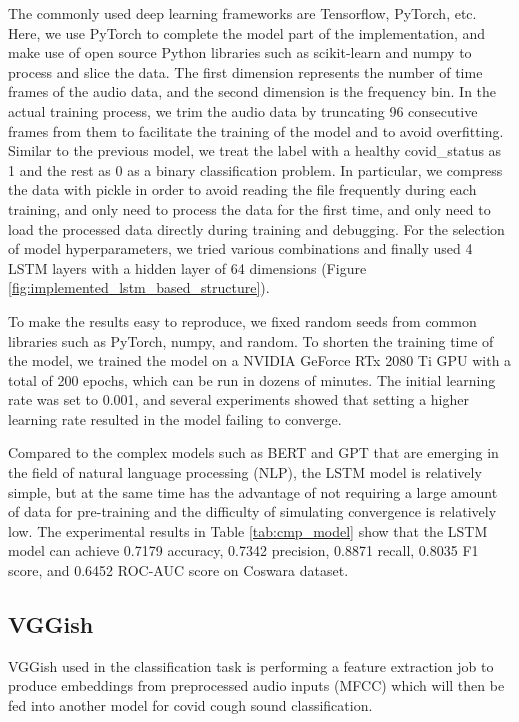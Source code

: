 \documentclass[11pt]{article}
\begin{document}
The commonly used deep learning frameworks are Tensorflow, PyTorch, etc. Here, we use PyTorch to complete the model part of the implementation, and make use of open source Python libraries such as scikit-learn and numpy to process and slice the data. The first dimension represents the number of time frames of the audio data, and the second dimension is the frequency bin. In the actual training process, we trim the audio data by truncating 96 consecutive frames from them to facilitate the training of the model and to avoid overfitting. Similar to the previous model, we treat the label with a healthy covid\_status as 1 and the rest as 0 as a binary classification problem. In particular, we compress the data with pickle in order to avoid reading the file frequently during each training, and only need to process the data for the first time, and only need to load the processed data directly during training and debugging. For the selection of model hyperparameters, we tried various combinations and finally used 4 LSTM layers with a hidden layer of 64 dimensions (Figure \ref{fig:implemented_lstm_based_structure}).

To make the results easy to reproduce, we fixed random seeds from common libraries such as PyTorch, numpy, and random. To shorten the training time of the model, we trained the model on a NVIDIA GeForce RTx 2080 Ti GPU with a total of 200 epochs, which can be run in dozens of minutes. The initial learning rate was set to 0.001, and several experiments showed that setting a higher learning rate resulted in the model failing to converge.

Compared to the complex models such as BERT \cite{devlin2018bert} and GPT \cite{floridi2020gpt} that are emerging in the field of natural language processing (NLP), the LSTM model is relatively simple, but at the same time has the advantage of not requiring a large amount of data for pre-training and the difficulty of simulating convergence is relatively low. The experimental results in Table \ref{tab:cmp_model} show that the LSTM model can achieve 0.7179 accuracy, 0.7342 precision, 0.8871 recall, 0.8035 F1 score, and 0.6452 ROC-AUC score on Coswara dataset.

\subsection{VGGish}

VGGish used in the classification task is performing a feature extraction job to produce embeddings from preprocessed audio inputs (MFCC) which will then be fed into another model for covid cough sound classification. 
\end{document}
